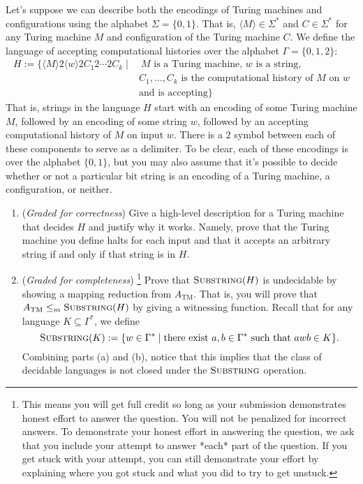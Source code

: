 \documentclass[12pt, oneside]{article}
\newcommand{\gradeCorrect}{({\it Graded for correctness}) }
\newcommand{\gradeComplete}{({\it Graded for completeness}) }
\newcommand{\gradeCompleteFirst}{\gradeComplete\footnote{This means you will 
get full credit so long as your submission demonstrates honest effort to 
answer the question. You will not be penalized for incorrect answers. 
To demonstrate your honest effort in answering the question, we ask 
that you include your attempt to answer *each* part of the question. 
If you get stuck with your attempt, you can still demonstrate 
your effort by explaining where you got stuck and what 
you did to try to get unstuck.} }
\newcommand{\SUBSTRING}{\textsc{Substring}}
\begin{document}
\begin{enumerate}
Let's suppose we can describe both the encodings of Turing 
machines and configurations using the alphabet 
$\Sigma = \{0,1\}$. 
That is, $\langle M \rangle \in \Sigma^*$ and $C \in 
\Sigma^*$ for any Turing machine $M$ and configuration of the 
Turing machine $C$. We  define the language of accepting 
computational histories over the alphabet $\Gamma = \{0,1, 
2\}$:
\begin{align*}
H:= \{ \langle M \rangle 2 \langle w \rangle 2 C_1 2 \cdots 2 C_k \mid& ~M \textrm{ is a Turing machine, $w$ is a string,} \\
&C_1, \ldots, C_k \text{ is the computational history of } M \text{ on } w \\
&\text{and is accepting} \}
\end{align*}
That is, strings in the language $H$ start with an encoding of 
some Turing machine $M$, followed by an encoding of 
some string $w$, followed by an accepting computational 
history of $M$ on input $w$. There is a $2$ symbol between 
each of these components to serve as a delimiter. To be clear, 
each of these encodings is over the alphabet $\{0,1\}$, but 
you may also assume that it's possible to decide whether or 
not a particular bit string is an encoding of a Turing 
machine, a configuration, or neither.

\begin{enumerate}
\item\gradeCorrect Give a high-level description for 
a Turing machine that decides $H$ and justify 
why it works. Namely, prove that the Turing machine 
you define halts for each input and that it accepts
an arbitrary string if and only if that string is in $H$.
\item\gradeCompleteFirst Prove that $\SUBSTRING(H)$ is undecidable by showing a mapping reduction from $A_{\mathrm{TM}}$. That is, you will 
prove that $A_{\mathrm{TM}} \le_m \SUBSTRING(H)$
by giving a witnessing function. Recall that for any language $K \subseteq \Gamma^*$, we define 
\[
    \SUBSTRING(K) := \{ w \in \Gamma^* \mid \text{there exist } a,b \in \Gamma^* \text{ such that } awb \in K\}.
\]
Combining parts (a) and (b), notice that this implies that the 
class of decidable languages is not closed under the 
$\SUBSTRING$ operation. 

\end{enumerate}

\end{enumerate}
\end{document}
